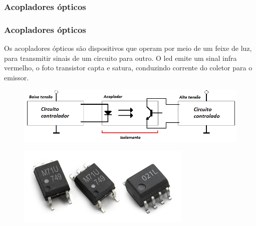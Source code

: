 \subsubsection{Acopladores ópticos}

\begin{frame}
\frametitle{Acopladores ópticos}

Os acopladores ópticos são dispositivos que operam por meio de um feixe de luz, 
para transmitir sinais de um circuito para outro.
O led emite um sinal infra vermelho, o foto transistor capta e satura,
conduzindo corrente do coletor para o emissor.

\begin{figure}
\centering
\includegraphics[scale = 0.4]{figuras/acoplador}
\end{figure}

\begin{figure}
\centering
\includegraphics[scale = 0.2]{figuras/fotoacoplador}
\end{figure}

\end{frame}
